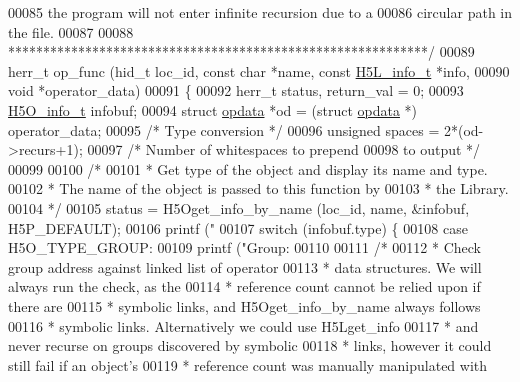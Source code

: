 \begin{DoxyCode}
00085 \textcolor{comment}{  the program will not enter infinite recursion due to a}
00086 \textcolor{comment}{  circular path in the file.}
00087 \textcolor{comment}{}
00088 \textcolor{comment}{ ************************************************************/}
00089 herr\_t op\_func (hid\_t loc\_id, \textcolor{keyword}{const} \textcolor{keywordtype}{char} *name, \textcolor{keyword}{const} \hyperlink{struct_h5_l__info__t}{H5L\_info\_t} *info,
00090             \textcolor{keywordtype}{void} *operator\_data)
00091 \{
00092     herr\_t          status, return\_val = 0;
00093     \hyperlink{struct_h5_o__info__t}{H5O\_info\_t}      infobuf;
00094     \textcolor{keyword}{struct }\hyperlink{structopdata}{opdata}   *od = (\textcolor{keyword}{struct }\hyperlink{structopdata}{opdata} *) operator\_data;
00095                                 \textcolor{comment}{/* Type conversion */}
00096     \textcolor{keywordtype}{unsigned}        spaces = 2*(od->recurs+1);
00097                                 \textcolor{comment}{/* Number of whitespaces to prepend}
00098 \textcolor{comment}{                                   to output */}
00099 
00100     \textcolor{comment}{/*}
00101 \textcolor{comment}{     * Get type of the object and display its name and type.}
00102 \textcolor{comment}{     * The name of the object is passed to this function by}
00103 \textcolor{comment}{     * the Library.}
00104 \textcolor{comment}{     */}
00105     status = H5Oget\_info\_by\_name (loc\_id, name, &infobuf, H5P\_DEFAULT);
00106     printf (\textcolor{stringliteral}{"%
00107     \textcolor{keywordflow}{switch} (infobuf.type) \{
00108         \textcolor{keywordflow}{case} H5O\_TYPE\_GROUP:
00109             printf (\textcolor{stringliteral}{"Group: %
00110 
00111             \textcolor{comment}{/*}
00112 \textcolor{comment}{             * Check group address against linked list of operator}
00113 \textcolor{comment}{             * data structures.  We will always run the check, as the}
00114 \textcolor{comment}{             * reference count cannot be relied upon if there are}
00115 \textcolor{comment}{             * symbolic links, and H5Oget\_info\_by\_name always follows}
00116 \textcolor{comment}{             * symbolic links.  Alternatively we could use H5Lget\_info}
00117 \textcolor{comment}{             * and never recurse on groups discovered by symbolic}
00118 \textcolor{comment}{             * links, however it could still fail if an object's}
00119 \textcolor{comment}{             * reference count was manually manipulated with}
}}
\end{DoxyCode}

